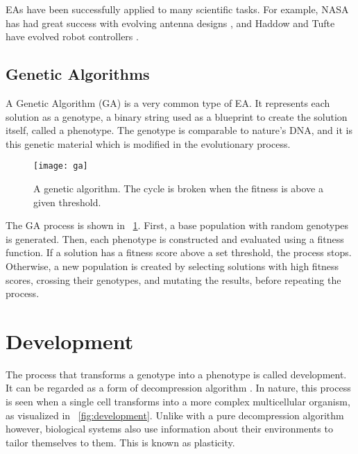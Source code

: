 EAs have been successfully applied to many scientific tasks.
For example, NASA has had great success with evolving antenna designs \cite{hornby2006antenna}, and Haddow and Tufte have evolved robot controllers \cite{haddow1999robot}.

\subsection{Genetic Algorithms}

A Genetic Algorithm (GA) is a very common type of EA.
It represents each solution as a genotype, a binary string used as a blueprint to create the solution itself, called a phenotype.
The genotype is comparable to nature's DNA, and it is this genetic material which is modified in the evolutionary process.

\begin{figure}[!ht]
    \centering
    \texttt{[image: ga]}
    \caption[Genetic Algorithm]{
        A genetic algorithm.
        The cycle is broken when the fitness is above a given threshold.
    }
    \label{fig:ga}
\end{figure}

The GA process is shown in \figurename~\ref{fig:ga}.
First, a base population with random genotypes is generated.
Then, each phenotype is constructed and evaluated using a fitness function.
If a solution has a fitness score above a set threshold, the process stops.
Otherwise, a new population is created by selecting solutions with high fitness scores, crossing their genotypes, and mutating the results, before repeating the process.


\section{Development}

The process that transforms a genotype into a phenotype is called development.
It can be regarded as a form of decompression algorithm \cite{harding2008artificial}.
In nature, this process is seen when a single cell transforms into a more complex multicellular organism, as visualized in \figurename~\ref{fig:development}.
Unlike with a pure decompression algorithm however, biological systems also use information about their environments to tailor themselves to them.
This is known as plasticity.

